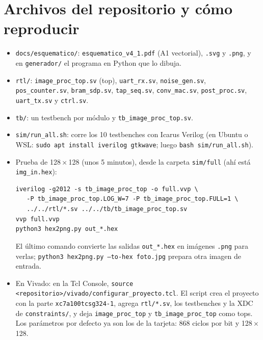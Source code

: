 \documentclass[11pt,a4paper]{article}
\begin{document}
\section{Archivos del repositorio y cómo reproducir}
\begin{itemize}
\item \texttt{docs/esquematico/}: \texttt{esquematico\_v4\_1.pdf} (A1 vectorial), \texttt{.svg} y \texttt{.png}, y en \texttt{generador/} el programa en Python que lo dibuja.
\item \texttt{rtl/}: \texttt{image\_proc\_top.sv} (top), \texttt{uart\_rx.sv}, \texttt{noise\_gen.sv}, \texttt{pos\_counter.sv}, \texttt{bram\_sdp.sv}, \texttt{tap\_seq.sv}, \texttt{conv\_mac.sv}, \texttt{post\_proc.sv}, \texttt{uart\_tx.sv} y \texttt{ctrl.sv}.
\sloppy
\item \texttt{tb/}: un testbench por módulo y \texttt{tb\_image\_proc\_top.sv}.
\item \texttt{sim/run\_all.sh}: corre los 10 testbenches con Icarus Verilog (en Ubuntu o WSL: \texttt{sudo apt install iverilog gtkwave}; luego \texttt{bash sim/run\_all.sh}).
\item Prueba de 128\,×\,128 (unos 5 minutos), desde la carpeta \texttt{sim/full} (ahí está \texttt{img\_in.hex}):
\begin{verbatim}
iverilog -g2012 -s tb_image_proc_top -o full.vvp \
   -P tb_image_proc_top.LOG_W=7 -P tb_image_proc_top.FULL=1 \
   ../../rtl/*.sv ../../tb/tb_image_proc_top.sv
vvp full.vvp
python3 hex2png.py out_*.hex
\end{verbatim}
El último comando convierte las salidas \texttt{out\_*.hex} en imágenes \texttt{.png} para verlas; \texttt{python3 hex2png.py --to-hex foto.jpg} prepara otra imagen de entrada.
\item En Vivado: en la Tcl Console, \texttt{source <repositorio>/vivado/configurar\_proyecto.tcl}. El script crea el proyecto con la parte \texttt{xc7a100tcsg324-1}, agrega \texttt{rtl/*.sv}, los testbenches y la XDC de \texttt{constraints/}, y deja \texttt{image\_proc\_top} y \texttt{tb\_image\_proc\_top} como tops. Los parámetros por defecto ya son los de la tarjeta: 868 ciclos por bit y 128\,×\,128.
\end{itemize}
\end{document}
